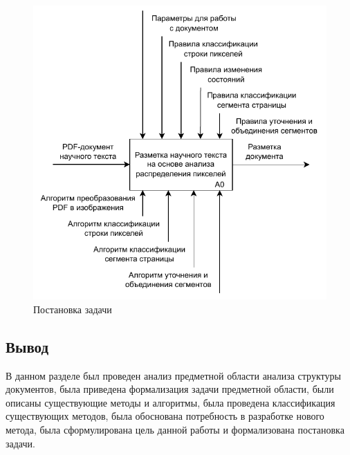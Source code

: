 \begin{figure}[H]
	\centering
	\includegraphics[width=\textwidth]{diag/a0.pdf}
	\caption{Постановка задачи}
	\label{fig:a0}
\end{figure}

\subsection*{Вывод}

В данном разделе был проведен анализ предметной области анализа структуры документов, была приведена формализация задачи предметной области, были описаны существующие методы и алгоритмы, была проведена классификация существующих методов, была обоснована потребность в разработке нового метода, была сформулирована цель данной работы и формализована постановка задачи.

